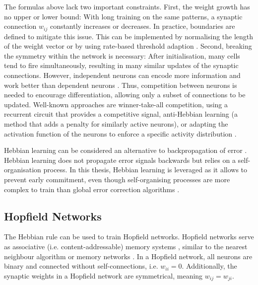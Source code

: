 The formulas above lack two important constraints.
First, the weight growth has no upper or lower bound: With long training on the same patterns, a synaptic connection $w_{ij}$ constantly increases or decreases. In practice, boundaries are defined to mitigate this issue. This can be implemented by normalising the length of the weight vector \cite{oja_simplified_1982} or by using rate-based threshold adaption .
Second, breaking the symmetry within the network is necessary: After initialisation, many cells tend to fire simultaneously, resulting in many similar updates of the synaptic connections. However, independent neurons can encode more information and work better than dependent neurons .
Thus, competition between neurons is needed to encourage differentiation, allowing only a subset of connections to be updated.
Well-known approaches are winner-take-all competition, using a recurrent circuit that provides a competitive signal, anti-Hebbian learning  (a method that adds a penalty for similarly active neurons), or adapting the activation function of the neurons to enforce a specific activity distribution .

Hebbian learning can be considered an alternative to backpropagation of error \cite{rosenblatt_principles_1962, linnainmaa_taylor_1976}.
Hebbian learning does not propagate error signals backwards but relies on a self-organisation process.
In this thesis, Hebbian learning is leveraged as it allows to prevent early commitment, even though self-organising processes are more complex to train than global error correction algorithms .


\subsection{Hopfield Networks}
The Hebbian rule can be used to train Hopfield networks.
Hopfield networks serve as associative (i.e. content-addressable) memory systems , similar to the nearest neighbour algorithm  or memory networks .
In a Hopfield network, all neurons are binary and connected without self-connections, i.e. $w_{ii}=0$.
Additionally, the synaptic weights in a Hopfield network are symmetrical, meaning \(w_{ij} = w_{ji}\).

